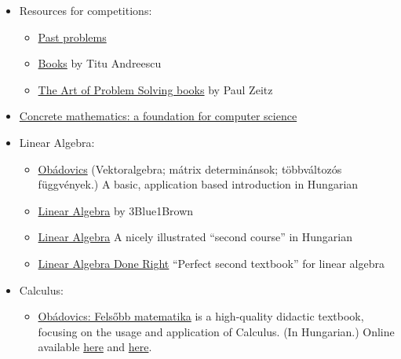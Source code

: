 \documentclass{article}
\begin{document}
\begin{itemize}
\begin{itemize}
    \end{itemize}

    \item Resources for competitions:
    \begin{itemize}
        \item \underline{Past problems}
        \item \href{https://www.goodreads.com/author/list/121670.Titu_Andreescu}{Books} by Titu Andreescu
        \item \href{https://www.goodreads.com/author/show/322957.Paul_Zeitz}{The Art of Problem Solving books} by Paul Zeitz
    \end{itemize}
    
    \item \href{https://www.goodreads.com/book/show/112243.Concrete_Mathematics}{Concrete mathematics: a foundation for computer science}
    
    \item Linear Algebra:
    \begin{itemize}
        \item \href{https://www.scolar.hu/vektoralgebra_matrixok_determinansok_tobbvaltozos_fuggvenyek_1820}{Obádovics} (Vektoralgebra; mátrix determinánsok; többváltozós függvények.) A basic, application based introduction in Hungarian
        
        \item \href{https://www.youtube.com/playlist?list=PLZHQObOWTQDPD3MizzM2xVFitgF8hE_ab}{Linear Algebra} by 3Blue1Brown
        
        
        \item \href{https://web.archive.org/web/20160717031653/http://tankonyvtar.ttk.bme.hu/pdf/14.pdf}{Linear Algebra} A nicely illustrated ``second course'' in Hungarian
        
        \item \href{https://www.goodreads.com/book/show/309768.Linear_Algebra_Done_Right}{Linear Algebra Done Right} ``Perfect second textbook'' for linear algebra
    \end{itemize}
    
    \item Calculus:
    \begin{itemize}
        \item \href{https://moly.hu/konyvek/obadovics-j-gyula-szarka-zoltan-felsobb-matematika}{Obádovics: Felsőbb matematika} is a high-quality didactic textbook, focusing on the usage and application of Calculus. (In Hungarian.) Online available \href{https://www.scribd.com/doc/96616339/Obadovics-J-Gyula-Fels\%C5\%91bb-matematika}{here} and \href{https://datagrid.hu/boda/Boda-sajat/Rush/Matek/obadovics_felsobb_matematika.pdf}{here}.
        

\end{itemize}
\end{itemize}
\end{document}
